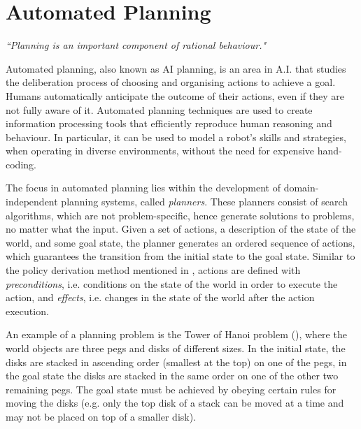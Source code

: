 \section{Automated Planning}\label{sec:AP}
\begin{center}
\textit{``Planning is an important component of rational behaviour." }\\ \cite{ghallab2004automated}
\end{center}


Automated planning, also known as AI planning, is an area in A.I. that studies the deliberation process of choosing and organising actions to achieve a goal. 
Humans automatically anticipate the outcome of their actions, even if they are not fully aware of it. 
Automated planning techniques are used to create information processing tools that efficiently reproduce human reasoning and behaviour. 
In particular, it can be used to model a robot's skills and strategies, when operating in diverse environments, without the need for expensive hand-coding.

The focus in automated planning lies within the development of {domain-independent} planning systems, called \textit{planners}.
These planners consist of search algorithms, which are not problem-specific, hence generate solutions to problems, no matter what the input. 
Given a set of actions, a description of the state of the world, and some goal state, the planner generates an ordered sequence of actions, which guarantees the transition from the initial state to the goal state. 
Similar to the policy derivation method mentioned in , actions are defined with \textit{preconditions}, i.e. conditions on the state of the world in order to execute the action, and \textit{effects}, i.e. changes in the state of the world after the action execution. 

An example of a planning problem is the Tower of Hanoi problem (\cite{douglas1985metamagical}), where the world objects are three pegs and disks of different sizes. 
In the initial state, the disks are stacked in ascending order (smallest at the top) on one of the pegs, in the goal state the disks are stacked in the same order on one of the other two remaining pegs. 
The goal state must be achieved by obeying certain rules for moving the disks (e.g. only the top disk of a stack can be moved at a time and may not be placed on top of a smaller disk). 

